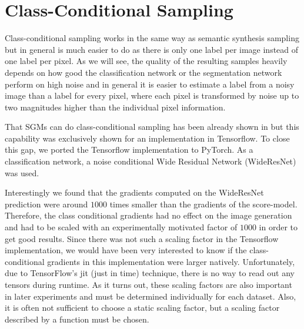 

\section{Class-Conditional Sampling} \label{sec:5.1}
Class-conditional sampling works in the same way as semantic synthesis sampling but in general is much easier to do as there is only one label per image instead of one label per pixel. As we will see, the quality of the resulting samples heavily depends on how good the classification network or the segmentation network perform on high noise and in general it is easier to estimate a label from a noisy image than a label for every pixel, where each pixel is transformed by noise up to two magnitudes higher than the individual pixel information.

That SGMs can do class-conditional sampling has been already shown in \cite{score_3} but this capability was exclusively shown for an implementation in Tensorflow. To close this gap, we ported the Tensorflow implementation to PyTorch. As a classification network, a noise conditional Wide Residual Network (WideResNet) \cite{wrn} was used. 

Interestingly we found that the gradients computed on the WideResNet prediction were around $1000$ times smaller than the gradients of the score-model. Therefore, the class conditional gradients had no effect on the image generation and had to be scaled with an experimentally motivated factor of $1000$ in order to get good results. Since there was not such a scaling factor in the Tensorflow implementation, we would have been very interested to know if the class-conditional gradients in this implementation were larger natively. Unfortunately, due to TensorFlow's jit (just in time) technique, there is no way to read out any tensors during runtime. As it turns out, these scaling factors are also important in later experiments and must be determined individually for each dataset. Also, it is often not sufficient to choose a static scaling factor, but a scaling factor described by a function must be chosen.

